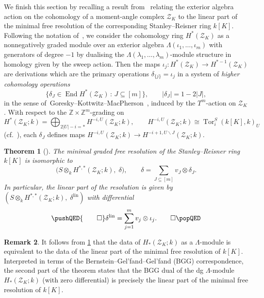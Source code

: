\documentclass[a4paper,10pt]{amsart}
\newtheorem{theorem}{Theorem}[section]
\theoremstyle{definition}
\newtheorem{remark}[theorem]{Remark}
\theoremstyle{remark}
\DeclareMathOperator{\Tor}{Tor}
\begin{document}
We finish this section by recalling a result from~\cite{AB} relating the exterior algebra action on the cohomology of a moment-angle complex $\mathcal{Z}_K$ to the linear part of the minimal free resolution of the corresponding Stanley--Reisner ring $k[K]$. Following the notation of~\cite{AB}, we consider the cohomology ring $H^*(\mathcal{Z}_K)$ as a nonnegatively graded module over an exterior algebra $\Lambda(\iota_1,\ldots,\iota_m)$ with generators of degree $-1$ by dualising the $\Lambda(\lambda_1,\ldots,\lambda_m)$-module structure in homology given by the sweep action. Then the maps $\iota_j\colon H^*(\mathcal{Z}_K)\to H^{*-1}(\mathcal{Z}_K)$ are derivations which are the primary operations $\delta_{\{j\}}=\iota_j$ in a system of \emph{higher cohomology operations} 
\[
\big\{\delta_J\in\operatorname{End}H^*(\mathcal{Z}_K) \,:\, J\subseteq[m]\big\}, \qquad |\delta_J|=1-2|J|,
\]
in the sense of~Goresky--Kottwitz--MacPherson~\cite{GKM}, induced by the $T^m$-action on $\mathcal{Z}_K$. With respect to the $\mathbb{Z}\times\mathbb{Z}^m$-grading on 
\[
H^*(\mathcal{Z}_K;k)=\bigoplus_{2|U|-i=*}H^{-i,U}(\mathcal{Z}_K;k), \qquad H^{-i,U}(\mathcal{Z}_K;k)\cong\Tor^S_{i}(k[K],k)_U
\]
(cf.~\cite[Theorem~4.5.7]{BP}), each $\delta_J$ defines maps $H^{-i,U}(\mathcal{Z}_K;k) \to H^{-i+1,U\smallsetminus J}(\mathcal{Z}_K;k)$.

\begin{theorem}[{\cite[Theorem~A]{AB}}] \label{thm_min_res}
The minimal graded free resolution of the Stanley--Reisner ring $k[K]$ is isomorphic to
\[
\big(S\otimes_k H^{*,*}(\mathcal{Z}_K;k),\; \delta\big), \qquad \delta=\sum_{J\subseteq[m]} v_J\otimes\delta_J. 
\]
In particular, the linear part of the resolution is given by
$\left(S\otimes_k H^{*,*}(\mathcal{Z}_K;k),\; \delta^\mathrm{lin}\right)$ with differential
\[
\pushQED{\qed} 
\delta^\mathrm{lin}=\sum_{j=1}^m v_j\otimes\iota_j. \qedhere
\popQED
\]
\end{theorem} 

\begin{remark}\label{rem_linear_part_action}
It follows from \cref{thm_min_res} that the data of $H_*(\mathcal{Z}_K;k)$ as a $\Lambda$-module is equivalent to the data of the linear part of the minimal free resolution of $k[K]$. Interpreted in terms of the Bernstein--Gel'fand--Gel'fand (BGG) correspondence, the second part of the theorem states that the BGG dual of the dg $\Lambda$-module $H_*(\mathcal{Z}_K;k)$ (with zero differential) is precisely the linear part of the minimal free resolution of $k[K]$.
\end{remark}
\end{document}
